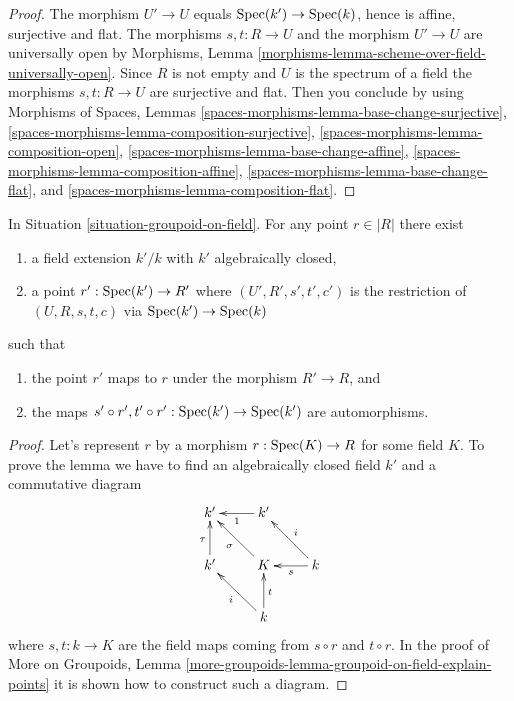 \begin{proof}
The morphism $U' \to U$ equals $\mathop{\mathrm{Spec}}(k') \to \mathop{\mathrm{Spec}}(k)$,
hence is affine, surjective and flat. The morphisms $s, t : R \to U$
and the morphism $U' \to U$ are universally open by
Morphisms, Lemma \ref{morphisms-lemma-scheme-over-field-universally-open}.
Since $R$ is not empty and $U$ is the spectrum of a field the morphisms
$s, t : R \to U$ are surjective and flat. Then you conclude by using
Morphisms of Spaces, Lemmas
\ref{spaces-morphisms-lemma-base-change-surjective},
\ref{spaces-morphisms-lemma-composition-surjective},
\ref{spaces-morphisms-lemma-composition-open},
\ref{spaces-morphisms-lemma-base-change-affine},
\ref{spaces-morphisms-lemma-composition-affine},
\ref{spaces-morphisms-lemma-base-change-flat}, and
\ref{spaces-morphisms-lemma-composition-flat}.
\end{proof}

\begin{lemma}
\label{lemma-groupoid-on-field-explain-points}
In
Situation \ref{situation-groupoid-on-field}.
For any point $r \in |R|$ there exist
\begin{enumerate}
\item a field extension $k'/k$ with $k'$ algebraically closed,
\item a point $r' : \mathop{\mathrm{Spec}}(k') \to R'$ where
$(U', R', s', t', c')$ is the restriction of $(U, R, s, t, c)$
via $\mathop{\mathrm{Spec}}(k') \to \mathop{\mathrm{Spec}}(k)$
\end{enumerate}
such that
\begin{enumerate}
\item the point $r'$ maps to $r$ under the morphism $R' \to R$, and
\item the maps
$s' \circ r', t' \circ r' : \mathop{\mathrm{Spec}}(k') \to \mathop{\mathrm{Spec}}(k')$
are automorphisms.
\end{enumerate}
\end{lemma}

\begin{proof}
Let's represent $r$ by a morphism $r : \mathop{\mathrm{Spec}}(K) \to R$ for some
field $K$. To prove the lemma we have to find an algebraically closed
field $k'$ and a commutative diagram
$$
\xymatrix{
k' & k' \ar[l]^1 & \\
k' \ar[u]^\tau & K \ar[lu]^\sigma & k \ar[l]^-s \ar[lu]_i \\
& k \ar[lu]^i \ar[u]_t
}
$$
where $s, t : k \to K$ are the field maps coming from
$s \circ r$ and $t \circ r$. In the proof of
More on Groupoids,
Lemma \ref{more-groupoids-lemma-groupoid-on-field-explain-points}
it is shown how to construct such a diagram.
\end{proof}

